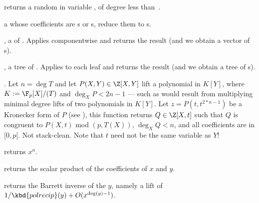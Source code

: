  returns a random
 in variable , of degree less than~.


  a  whose
coefficients are s or s, reduce them to s.

,  a  of . Applies
 componentwise and returns the result (and we obtain a vector
of s).

,  a tree of . Applies
 to each leaf and returns the result (and we obtain a tree
of s).


. Let $n = \deg T$ and let
$P(X,Y)\in \Z[X,Y]$ lift a polynomial in $K[Y]$, where $K := \F_p[X]/(T)$ and
$\deg_X P < 2n-1$ --- such as would result from multiplying minimal degree
lifts of two polynomials in $K[Y]$. Let $z = P(t,t^{2*n-1})$ be a Kronecker
form of $P$ (see ), this function returns $Q\in
\Z[X,t]$ such that $Q$ is congruent to $P(X,t)$ mod $(p, T(X))$, $\deg_X Q <
n$, and all coefficients are in $[0,p[$. Not stack-clean. Note that $t$ need
not be the same variable as $Y$!







 returns $x^n$.


 returns the scalar
product of the coefficients of $x$ and $y$.


 returns the Barrett inverse of
the  $y$, namely a lift of $1/\kbd{polrecip}(y)+O(x^{\deg(y)-1})$.

